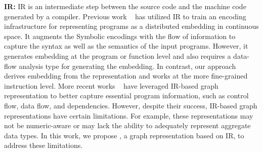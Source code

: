 \textbf{IR: }
IR is an intermediate step between the source code and the machine code generated by a compiler. Previous work ~\cite{venkatakeerthy2020ir2vec} has utilized IR to train an encoding infrastructure for representing programs as a distributed embedding in continuous space. It augments the Symbolic encodings with the flow of information to capture the syntax as well as the semantics of the input programs. However, it generates embedding at the program or function level and also requires a data-flow analysis type for generating the embedding. In contrast, our approach derives embedding from the representation and works at the more fine-grained instruction level. More recent works ~\cite{ben2018neural, cummins2020programl, brauckmann2020compiler} have leveraged IR-based graph representation to better capture essential program information, such as control flow, data flow, and dependencies.
However, despite their success, IR-based graph representations have certain limitations.
For example, these representations may not be numeric-aware or may lack the ability to adequately represent aggregate data types. In this work, we propose \ourtool, a graph representation based on IR, to address these limitations.